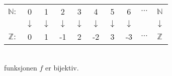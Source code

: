 \documentclass[a4paper, 12pt]{article}  %
\begin{document}
\begin{enumerate}
\begin{enumerate}
        \begin{table*}[h]
            \centering
            \begin{tabular}{cccccccccc}
                \(\mathbb{N:}\) & 0 & 1 & 2 & 3 & 4 & 5 & 6 & \(\cdots\) & \(\mathbb{N}\)\\
                & \(\downarrow\) & \(\downarrow\) & \(\downarrow\) & \(\downarrow\) & \(\downarrow\) & \(\downarrow\) & \(\downarrow\) & & \(\downarrow\)\\
                \(\mathbb{Z}:\) & 0 & 1 & -1 & 2 & -2 & 3 & -3 & \(\cdots\) & \(\mathbb{Z}\)\\
            \end{tabular}
            \\[1em]funksjonen \(f\) er bijektiv.
        \end{table*}        
    \end{enumerate}
\end{enumerate}

\end{document}
